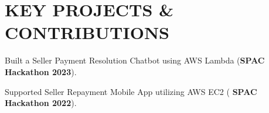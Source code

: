 \section{KEY PROJECTS \& CONTRIBUTIONS}
\begin{onecolentry}
    \begin{highlights}
        \item Built a Seller Payment Resolution Chatbot using AWS Lambda (\textbf{SPAC Hackathon 2023}).
        \item Supported Seller Repayment Mobile App utilizing AWS EC2 (
        \textbf{SPAC Hackathon 2022}).
    \end{highlights}
\end{onecolentry}